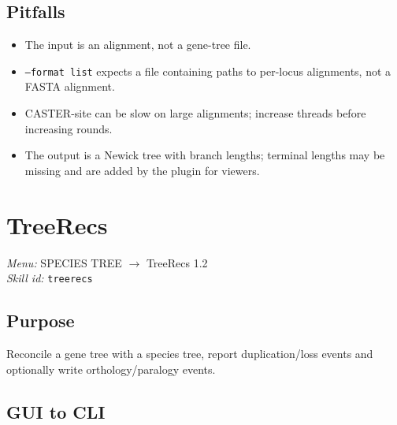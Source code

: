 \documentclass[11pt]{report}
\begin{document}
\subsection{Pitfalls}

\begin{itemize}
  \item The input is an alignment, not a gene-tree file.
  \item \texttt{--format list} expects a file containing paths to per-locus alignments, not a FASTA alignment.
  \item CASTER-site can be slow on large alignments; increase threads before increasing rounds.
  \item The output is a Newick tree with branch lengths; terminal lengths may be missing and are added by the plugin for viewers.
\end{itemize}


\section{TreeRecs}
\noindent\textit{Menu:} SPECIES TREE $\rightarrow$ TreeRecs 1.2\\
\noindent\textit{Skill id:} \texttt{treerecs}

\subsection{Purpose}

Reconcile a gene tree with a species tree, report duplication/loss events and optionally write orthology/paralogy events.

\subsection{GUI to CLI}
\end{document}
